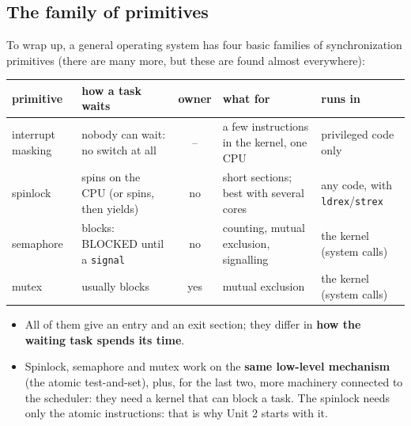 \subsection{The family of primitives}
To wrap up, a general operating system has four basic families of synchronization primitives (there are many more, but these are found almost everywhere):
\begin{center}
\small
\begin{tabular}{P{0.15} P{0.23} c P{0.23} P{0.2}}
    \hline
    \textbf{primitive} & \textbf{how a task waits} & \textbf{owner} & \textbf{what for} & \textbf{runs in} \\
    \hline
    interrupt masking & nobody can wait: no switch at all & -- & a few instructions in the kernel, one CPU & privileged code only \\
    spinlock & spins on the CPU (or spins, then yields) & no & short sections; best with several cores & any code, with \texttt{ldrex}/\texttt{strex} \\
    semaphore & blocks: BLOCKED until a \texttt{signal} & no & counting, mutual exclusion, signalling & the kernel (system calls) \\
    mutex & usually blocks & yes & mutual exclusion & the kernel (system calls) \\
    \hline
\end{tabular}
\end{center}
\begin{itemize}
    \item All of them give an entry and an exit section; they differ in \textbf{how the waiting task spends its time}.
    \item Spinlock, semaphore and mutex work on the \textbf{same low-level mechanism} (the atomic test-and-set), plus, for the last two, more machinery connected to the scheduler: they need a kernel that can block a task. The spinlock needs only the atomic instructions: that is why Unit 2 starts with it.
\end{itemize}

